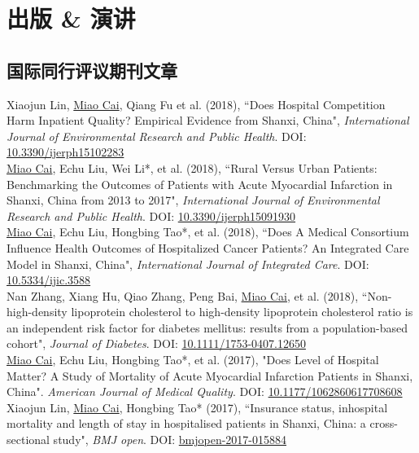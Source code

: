 \documentclass[11pt, a4paper]{article}
\newcommand{\years}[1]{\marginnote{\scriptsize #1}}
\begin{document}
\section*{出版 \& 演讲}

\subsection*{国际同行评议期刊文章}
\noindent
\years{2018}Xiaojun Lin, \underline{Miao Cai}, Qiang Fu et al. (2018), “Does Hospital Competition Harm Inpatient Quality? Empirical Evidence from Shanxi, China", \emph{International Journal of Environmental Research and Public Health}. DOI: \href{https://doi.org/10.3390/ijerph15102283}{10.3390/ijerph15102283}\\
\years{2018}\underline{Miao Cai}, Echu Liu, Wei Li*, et al. (2018), “Rural Versus Urban Patients: Benchmarking the Outcomes of Patients with Acute Myocardial Infarction in Shanxi, China from 2013 to 2017", \emph{International Journal of Environmental Research and Public Health}. DOI: \href{https://doi.org/10.3390/ijerph15091930}{10.3390/ijerph15091930}\\
\years{2018}\underline{Miao Cai}, Echu Liu, Hongbing Tao*, et al. (2018), “Does A Medical Consortium Influence Health Outcomes of Hospitalized Cancer Patients? An Integrated Care Model in Shanxi, China", \emph{International Journal of Integrated Care}. DOI: \href{https://doi.org/10.5334/ijic.3588}{10.5334/ijic.3588}\\
\years{2018}Nan Zhang, Xiang Hu, Qiao Zhang, Peng Bai, \underline{Miao Cai}, et al. (2018), “Non-high-density lipoprotein cholesterol to high-density lipoprotein cholesterol ratio is an independent risk factor for diabetes mellitus: results from a population-based cohort", \emph{Journal of Diabetes}. DOI: \href{https://doi.org/10.1111/1753-0407.12650}{10.1111/1753-0407.12650}\\
\years{2017}\underline{Miao Cai}, Echu Liu, Hongbing Tao*, et al. (2017), "Does Level of Hospital Matter? A Study of Mortality of Acute Myocardial Infarction Patients in Shanxi, China". \emph{American Journal of Medical Quality}. DOI: \href{https://doi.org/10.1177/1062860617708608}{10.1177/1062860617708608}\\
\years{2017}Xiaojun Lin, \underline{Miao Cai}, Hongbing Tao* (2017), “Insurance status, inhospital mortality and length of stay in hospitalised patients in Shanxi, China: a cross-sectional study", \emph{BMJ open}. DOI: \href{https://doi.org/10.1136/bmjopen-2017-015884}{bmjopen-2017-015884}\\
\end{document}
